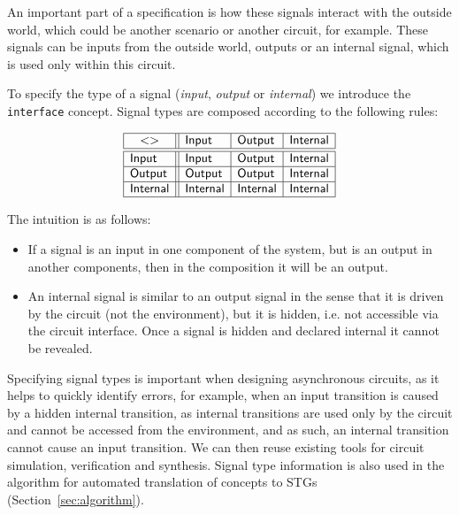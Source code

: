 \documentclass[british,conference,compsoc]{IEEEtran}
\begin{document}
An important part of a specification is how these signals interact with the 
outside world, which could be another scenario or another circuit, for example.
These signals can be inputs from the outside world, outputs or an internal 
signal, which is used only within this circuit. 

To specify the type of a signal (\emph{input},
\emph{output} or \emph{internal}) we introduce the \texttt{interface} concept.
Signal types are composed according to the following rules:

\vspace{-2mm}

\[
\begin{array}{|l||l|l|l|}
\hline
\multicolumn{1}{|c||}{<>} & \mathsf{Input} & \mathsf{Output} &
\mathsf{Internal} \\ \hline \hline
\mathsf{Input} & \mathsf{Input} & \mathsf{Output} & \mathsf{Internal} \\ \hline
\mathsf{Output} & \mathsf{Output} & \mathsf{Output} & \mathsf{Internal} \\
\hline
\mathsf{Internal}& \mathsf{Internal} & \mathsf{Internal} & \mathsf{Internal} \\
\hline
\end{array}
\]

The intuition is as follows:
\begin{itemize}
    \item If a signal is an input in one component of the system, but is an
    output in another components, then in the composition it will be an output.
    \item An internal signal is similar to an output signal in the sense
that it is driven by the circuit (not the environment), but it is hidden, 
i.e. not accessible via the circuit interface. Once a signal is hidden and 
declared internal it cannot be revealed.
\end{itemize}

\noindent Specifying signal types is important when designing asynchronous
circuits, as it helps to quickly identify errors, for example, when an input transition is
caused by a hidden internal transition, as internal transitions are used only by the circuit 
and cannot be accessed from the environment, and as such, an internal transition cannot
cause an input transition. We can then reuse existing tools for circuit
simulation, verification and synthesis. Signal type information is also used
in the algorithm for automated translation of concepts to
STGs (Section~\ref{sec:algorithm}).
\end{document}
